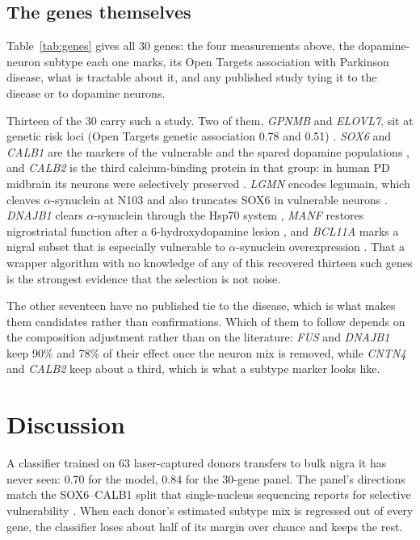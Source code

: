 \documentclass[11pt,a4paper]{article}
\begin{document}
\subsection{The genes themselves}

Table~\ref{tab:genes} gives all 30 genes: the four measurements above, the dopamine-neuron subtype each one
marks, its Open Targets association with Parkinson disease, what is tractable about it, and any published
study tying it to the disease or to dopamine neurons.

Thirteen of the 30 carry such a study. Two of them, \textit{GPNMB} and \textit{ELOVL7}, sit at genetic risk
loci (Open Targets genetic association 0.78 and 0.51) \citep{buniello2025,blauwendraat2020}. \textit{SOX6}
and \textit{CALB1} are the markers of the vulnerable and the spared dopamine populations
\citep{kamath2022,damier1999}, and \textit{CALB2} is the third calcium-binding protein in that group: in
human PD midbrain its neurons were selectively preserved \citep{mouattprigent1994}. \textit{LGMN} encodes
legumain, which cleaves $\alpha$-synuclein at N103 and also truncates SOX6 in vulnerable neurons
\citep{zhang2017,nie2025}. \textit{DNAJB1} clears $\alpha$-synuclein through the Hsp70 system
\citep{huang2025}, \textit{MANF} restores nigrostriatal function after a 6-hydroxydopamine lesion
\citep{voutilainen2009}, and \textit{BCL11A} marks a nigral subset that is especially vulnerable to
$\alpha$-synuclein overexpression \citep{tolve2021}. That a wrapper algorithm with no knowledge of any of
this recovered thirteen such genes is the strongest evidence that the selection is not noise.

The other seventeen have no published tie to the disease, which is what makes them candidates rather than
confirmations. Which of them to follow depends on the composition adjustment rather than on the literature:
\textit{FUS} and \textit{DNAJB1} keep 90\% and 78\% of their effect once the neuron mix is removed, while
\textit{CNTN4} and \textit{CALB2} keep about a third, which is what a subtype marker looks like.

\section{Discussion}

A classifier trained on 63 laser-captured donors transfers to bulk nigra it has never seen: 0.70 for the
model, 0.84 for the 30-gene panel. The panel's directions match the SOX6--CALB1 split that single-nucleus
sequencing reports for selective vulnerability \citep{kamath2022}. When each donor's estimated subtype mix is
regressed out of every gene, the classifier loses about half of its margin over chance and keeps the rest.
\end{document}
